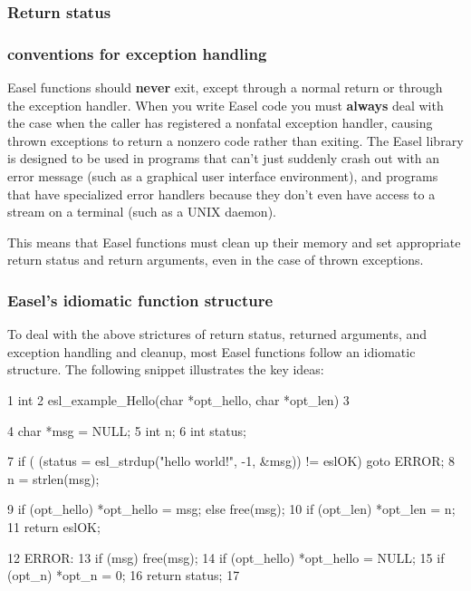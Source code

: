 \subsubsection{Return status}

\subsubsection{conventions for exception handling}

Easel functions should {\bfseries never} exit, except through a normal
return or through the exception handler. When you write Easel code you
must {\bfseries always} deal with the case when the caller has
registered a nonfatal exception handler, causing thrown exceptions to
return a nonzero code rather than exiting. The Easel library is
designed to be used in programs that can't just suddenly crash out
with an error message (such as a graphical user interface
environment), and programs that have specialized error handlers
because they don't even have access to a  stream on a
terminal (such as a UNIX daemon).

This means that Easel functions must clean up their memory and set
appropriate return status and return arguments, even in the case of
thrown exceptions.


\subsubsection{Easel's idiomatic function structure}

To deal with the above strictures of return status, returned
arguments, and exception handling and cleanup, most Easel functions
follow an idiomatic structure.  The following snippet illustrates the
key ideas:

\begin{cchunk}
1    int
2    esl_example_Hello(char *opt_hello, char *opt_len)
3    {
4      char *msg = NULL;
5      int   n;
6      int   status;

7      if ( (status = esl_strdup("hello world!\n", -1, &msg)) != eslOK) goto ERROR;
8      n = strlen(msg);

9      if (opt_hello) *opt_hello = msg; else free(msg);
10     if (opt_len)   *opt_len   = n;
11     return eslOK;

12  ERROR:
13     if (msg)        free(msg);
14     if (opt_hello) *opt_hello = NULL;
15     if (opt_n)     *opt_n     = 0;
16     return status;
17  }
\end{cchunk}

